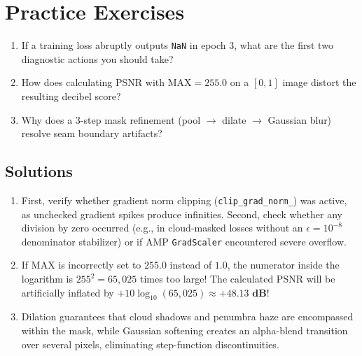\section{Practice Exercises}
\begin{enumerate}
    \item If a training loss abruptly outputs \texttt{NaN} in epoch 3, what are the first two diagnostic actions you should take?
    \item How does calculating PSNR with $\text{MAX}=255.0$ on a $[0, 1]$ image distort the resulting decibel score?
    \item Why does a 3-step mask refinement (pool $\to$ dilate $\to$ Gaussian blur) resolve seam boundary artifacts?
\end{enumerate}

\subsection*{Solutions}
\begin{enumerate}
    \item First, verify whether gradient norm clipping (\texttt{clip\_grad\_norm\_}) was active, as unchecked gradient spikes produce infinities. Second, check whether any division by zero occurred (e.g., in cloud-masked losses without an $\epsilon = 10^{-8}$ denominator stabilizer) or if AMP \texttt{GradScaler} encountered severe overflow.
    \item If $\text{MAX}$ is incorrectly set to $255.0$ instead of $1.0$, the numerator inside the logarithm is $255^2 = 65{,}025$ times too large! The calculated PSNR will be artificially inflated by $+10 \log_{10}(65{,}025) \approx \mathbf{+48.13\text{ dB}}$!
    \item Dilation guarantees that cloud shadows and penumbra haze are encompassed within the mask, while Gaussian softening creates an alpha-blend transition over several pixels, eliminating step-function discontinuities.
\end{enumerate}
